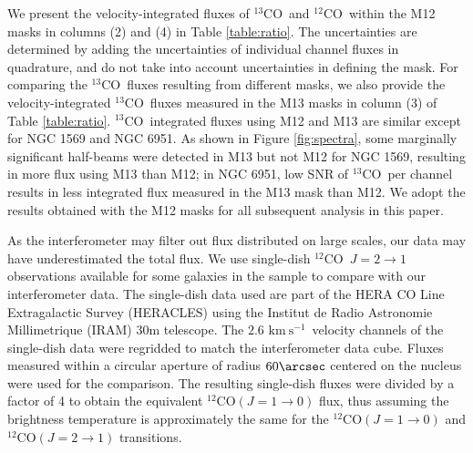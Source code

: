 \documentclass{emulateapj}
\def\ttco{\mbox{$^{13}$CO}}
\def\twco{\mbox{$^{12}$CO}}
\newcommand{\kms}{$\mathrm{km~s^{-1}}$}
\begin{document}
We present the velocity-integrated fluxes of \ttco \ and \twco \ within the M12 masks 
in columns (2) and (4) in Table \ref{table:ratio}. 
The uncertainties are determined by adding the uncertainties of individual 
channel fluxes in quadrature, and do not take into account uncertainties in defining
the mask.
For comparing the \ttco \ fluxes resulting from different masks, 
we also provide the velocity-integrated \ttco \  fluxes measured in the M13 masks in
column (3) of Table \ref{table:ratio}.  
\ttco \ integrated fluxes using M12 and M13 are similar except for NGC 1569 and NGC 6951. 
As shown in Figure \ref{fig:spectra},
some marginally significant half-beams were detected in M13 but not
M12 for NGC 1569, resulting in more flux using M13 than M12;  
in NGC 6951, low SNR of \ttco \ per channel results in less integrated 
flux measured in the M13 mask than M12. 
We adopt the results obtained with the M12 masks for all subsequent analysis in this 
paper.

\begin{figure*}
\caption{
CARMA and IRAM total flux spectra comparison. Black lines show the  total
  flux of \twco$(1 \rightarrow 0)$ using the M12 mask; 
magenta lines show the equivalent \twco($1 \rightarrow 0$) flux
derived from 1/4 of the total flux of \twco($2 \rightarrow 1$) measured by HERACLES.}
\label{fig:spectra_sd}
\end{figure*}

As the interferometer may filter out flux distributed on large scales, 
our data may have underestimated the total flux.
We use single-dish \twco \ $J = 2 \rightarrow 1 $ observations available 
for some galaxies in the sample to compare with our interferometer data.
The single-dish data used are part of 
the HERA CO Line Extragalactic Survey (HERACLES) \citep{Leroy2009} 
using the Institut de Radio Astronomie Millimetrique (IRAM) 
30m telescope. 
The $2.6$ \kms \ velocity channels of the single-dish data were regridded 
to match the interferometer data cube. 
Fluxes measured within a circular aperture of radius $60 \arcsec$ centered on 
the nucleus were used for the comparison. 
The resulting single-dish fluxes were divided by 
a factor of 4 to obtain the equivalent \twco$(J = 1 \rightarrow 0)$ flux,
thus assuming the brightness temperature is approximately 
the same for the \twco$(J = 1 \rightarrow 0)$ and  \twco$(J = 2
\rightarrow 1)$ transitions.
\end{document}
